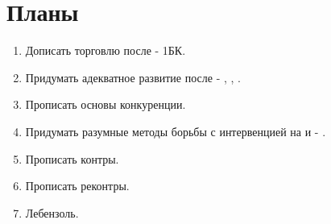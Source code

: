 \documentclass{article}
\begin{document}
\section{Планы}
\begin{enumerate}
    \item Дописать торговлю после  - 1БК.
    \item Придумать адекватное развитие после  - , , .
    \item Прописать основы конкуренции.
    \item Придумать разумные методы борьбы с интервенцией на  и  - .
    \item Прописать контры.
    \item Прописать реконтры.
    \item Лебензоль.
\end{enumerate}
\end{document}
